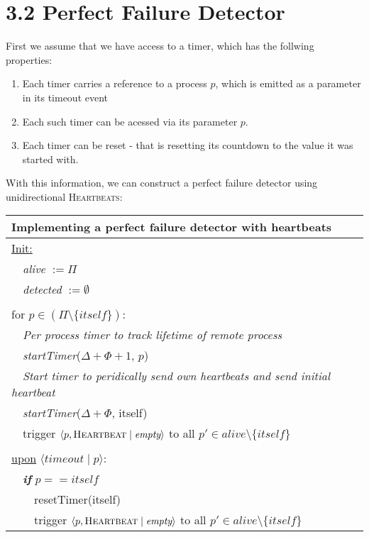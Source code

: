 \documentclass{article}
\begin{document}
	\section*{3.2 Perfect Failure Detector}
	\begin{adjustwidth}{2em}{2em}
		First we assume that we have access to a timer, which has the follwing properties:
		\begin{enumerate}
			\item Each timer carries a reference to a process $p$, which is emitted as a parameter in its timeout event
			\item Each such timer can be acessed via its parameter $p$.
			\item Each timer can be reset - that is resetting its countdown to the value it was started with.
		\end{enumerate}
		With this information, we can construct a perfect failure detector using unidirectional \textsc{Heartbeats}: \\
		\begin{center}
			\begin{tabular}{|l|}
				\hline
				Implementing a perfect failure detector with heartbeats \\
				\hline
				\underline{Init:} \\
				\ \ \textit{alive} $:= \Pi$ \\
				\ \ \textit{detected} $:= \emptyset$ \\
				\\
				for $p \in (\Pi \setminus \{itself\})$: \\
				\ \ \textit{Per process timer to track lifetime of remote process} \\
				\ \ \textit{startTimer}($\Delta + \Phi + 1$, $p$) \\
				\ \ \textit{Start timer to peridically send own heartbeats and send initial heartbeat} \\
				\ \ \textit{startTimer}($\Delta + \Phi$, itself) \\
				\ \ trigger $\langle p, \textsc{Heartbeat} \mid \textit{empty} \rangle$ to all $p' \in \textit{alive} \setminus \{ \textit{itself} \}$ \\
				\\
				\underline{upon} $\langle \textit{timeout} \mid p \rangle$: \\
				\ \ \textit{\textbf{if}} $p == \textit{itself}$ \\
				\ \ \ \ resetTimer(itself) \\
				\ \ \ \ trigger $\langle p, \textsc{Heartbeat} \mid \textit{empty} \rangle$ to all $p' \in \textit{alive} \setminus \{ \textit{itself} \}$ \\

\end{tabular}
\end{center}
\end{adjustwidth}
\end{document}

